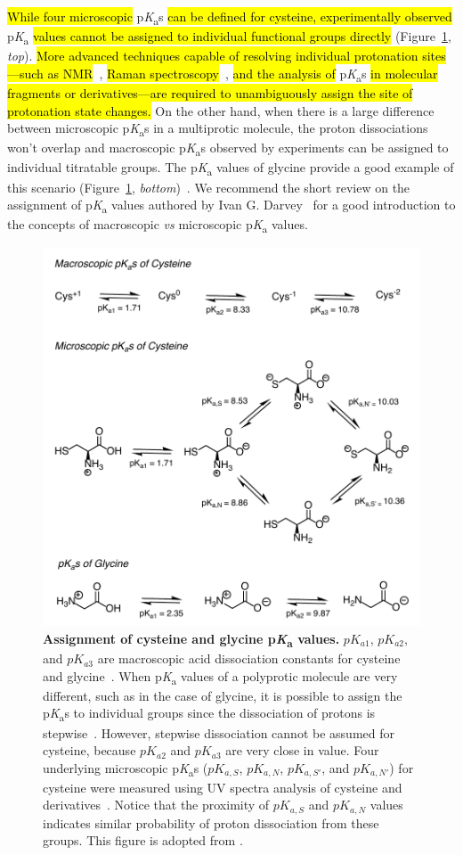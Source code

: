 \documentclass[9pt,lineno]{elife}
\newcommand{\pKa}{p\textit{K}\textsubscript{a}}
\begin{document}
\hl{While four microscopic} \pKa{}s \hl{can be defined for cysteine, experimentally observed} \pKa{} \hl{values cannot be assigned to individual functional groups directly} (Figure~\ref{fig:cys_vs_gly}, \emph{top}). \hl{More advanced techniques capable of resolving individual protonation sites---such as NMR}~\citep{bezencon_pka_2014}, \hl{Raman spectroscopy}~\citep{elson_raman_1962, elbagerma_raman_2011},\hl{ and the analysis of} \pKa{}s \hl{ in molecular fragments or derivatives---are required to unambiguously assign the site of protonation state changes.} 
On the other hand, when there is a large difference between microscopic \pKa{}s in a multiprotic molecule, the proton dissociations won't overlap and macroscopic \pKa{}s observed by experiments can be assigned to individual titratable groups. 
The \pKa{} values of glycine provide a good example of this scenario (Figure~\ref{fig:cys_vs_gly}, \emph{bottom})~\citep{bodner_assigning_1986,elson_raman_1962,darvey_assignment_1995}. 
We recommend the short review on the assignment of \pKa{} values authored by Ivan G. Darvey~\citep{darvey_assignment_1995} for a good introduction to the concepts of macroscopic \emph{vs} microscopic \pKa{} values.

\begin{figure}
\begin{center}
\includegraphics[width=0.65\linewidth]{figures/cysteine_vs_glycine_fig.pdf}
\caption{{\bf Assignment of cysteine and glycine \pKa{} values.}  $pK_{a1}$, $pK_{a2}$, and $pK_{a3}$ are macroscopic acid dissociation constants for cysteine and glycine~\citep{sober_handbook_1970}. 
When \pKa{} values of a polyprotic molecule are very different, such as in the case of glycine, it is possible to assign the \pKa{}s to individual groups since the dissociation of protons is stepwise~\citep{bodner_assigning_1986}. However, stepwise dissociation cannot be assumed for cysteine, because $pK_{a2}$ and $pK_{a3}$ are very close in value. Four underlying microscopic \pKa s ($pK_{a,S}$, $pK_{a,N}$, $pK_{a,S'}$, and $pK_{a,N'}$) for cysteine were measured using UV spectra analysis of cysteine and derivatives~\citep{doi:10.1021/ja01627a030}.
Notice that the proximity of $pK_{a,S}$ and $pK_{a,N}$ values indicates similar probability of proton dissociation from these groups. 
This figure is adopted from \citep{bodner_assigning_1986}. 
}
\label{fig:cys_vs_gly}
\end{center}
\end{figure}
\end{document}
